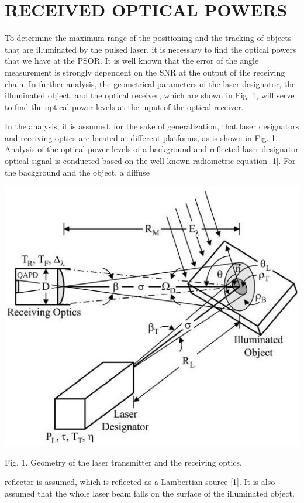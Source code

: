 \documentclass[10pt]{article}
\begin{document}
\section{RECEIVED OPTICAL POWERS}
To determine the maximum range of the positioning and the tracking of objects that are illuminated by the pulsed laser, it is necessary to find the optical powers that we have at the PSOR. It is well known that the error of the angle measurement is strongly dependent on the SNR at the output of the receiving chain. In further analysis, the geometrical parameters of the laser designator, the illuminated object, and the optical receiver, which are shown in Fig. 1, will serve to find the optical power levels at the input of the optical receiver.

In the analysis, it is assumed, for the sake of generalization, that laser designators and receiving optics are located at different platforms, as is shown in Fig. 1. Analysis of the optical power levels of a background and reflected laser designator optical signal is conducted based on the well-known radiometric equation [1]. For the background and the object, a diffuse

\includegraphics[max width=\textwidth]{5ecfdecb1168916efbeaf9054b715324-02}

Fig. 1. Geometry of the laser transmitter and the receiving optics.

reflector is assumed, which is reflected as a Lambertian source [1]. It is also assumed that the whole laser beam falls on the surface of the illuminated object.
\end{document}

